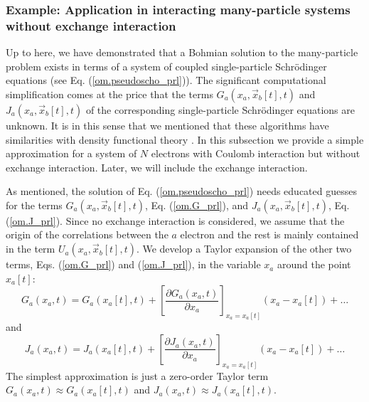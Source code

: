 \documentclass[nofootinbib, secnumarabic, amsmath, nobibnotes,10pt,aps,pra]{revtex4-1}
\newcommand{\eref}[1]{Eq. (\ref{#1})}
\begin{document}
\subsubsection{Example: Application in interacting many-particle systems without exchange interaction}

Up to here, we have demonstrated that a Bohmian solution to the
many-particle problem exists in terms of a system of coupled
single-particle Schr\"odinger equations (see
\eref{om.pseudoscho_prl}). The significant computational
simplification comes at the price that the terms
\textit{$G_{a}(x_{a},\vec x_{b}[t],t)$} and
\textit{$J_{a}(x_{a},\vec x_{b}[t],t)$} of the corresponding
single-particle Schr\"odinger equations are unknown. It is in this
sense that we mentioned that these algorithms have similarities with
density functional theory \cite{om.kohn1964,om.kohn1965}. In this
subsection we provide a simple approximation for a system of $N$
electrons with Coulomb interaction but without exchange interaction.
Later, we will include the exchange interaction.

As mentioned, the solution of \eref{om.pseudoscho_prl} needs
educated guesses for the terms \textit{$G_{a}(x_{a},\vec
x_{b}[t],t)$}, \eref{om.G_prl}, and \textit{$J_{a}(x_{a},\vec
x_{b}[t],t)$}, \eref{om.J_prl}. Since no exchange interaction is
considered, we assume that the origin of the correlations between the $a$ electron and the rest is
mainly contained in the term \textit{$U_{a}(x_{a},\vec
x_{b}[t],t)$}. We develop  a Taylor expansion of the other two terms, Eqs.
(\ref{om.G_prl}) and (\ref{om.J_prl}), in the variable $x_a$
around the point $x_a[t]$:
\begin{equation}
\label{om.G_prl_taylor}
G_{a}(x_a,t) = G_{a}(x_a[t],t) + \left[\frac {\partial G_{a}(x_a,t)} {\partial x_a} \right]_{x_a = x_a[t]}(x_a-x_a[t]) + \ldots
\end{equation}
and
\begin{equation}
\label{om.J_prl_taylor}
J_{a}(x_a,t) = J_{a}(x_a[t],t) + \left[\frac {\partial J_{a}(x_a,t)} {\partial x_a}\right]_{x_a = x_a[t]} (x_a-x_a[t]) + \ldots
\end{equation}
The simplest approximation is just a zero-order Taylor term \textit{$G_{a}(x_a,t) \approx G_{a}(x_a[t],t)$} and \textit{$J_{a}(x_a,t) \approx J_{a}(x_a[t],t)$}.
\end{document}
